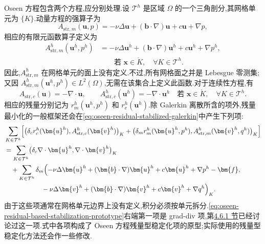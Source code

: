 \begin{example}\label{ex:oseen-residual-equations}
Oseen 方程包含两个方程,应分别处理.设 $\mathcal{T}^h$ 是区域 $\Omega$ 的一个三角剖分,其网格单元为 $\{K\}$.动量方程的强算子为
\[
  A_{\mathrm{str},m}(\bm{u},p)
  =-\nu\Delta\bm{u}
    +(\bm{b}\cdot\nabla)\bm{u}
    +c\bm{u}+\nabla p,
\]
相应的有限元函数算子定义为
\[
  \begin{aligned}
    A_{\mathrm{str},m}^h(\bm{u}^h,p^h)
      &=-\nu\Delta\bm{u}^h
        +(\bm{b}\cdot\nabla)\bm{u}^h
        +c\bm{u}^h+\nabla p^h,\\
      &\qquad\text{若 }\bm{x}\in\mathring{K},\quad
        \forall K\in\mathcal{T}^h.
  \end{aligned}
\]
因此,$A_{\mathrm{str},m}^h$ 在网格单元的面上没有定义.不过,所有网格面之并是 Lebesgue 零测集;又因 $A_{\mathrm{str},m}^h(\bm{u}^h,p^h)\in L^2(\Omega)$,无需在该集合上定义此函数.对于连续性方程,有
\[
  A_{\mathrm{str},c}(\bm{u})=-\nabla\cdot\bm{u},
  \qquad
  A_{\mathrm{str},c}^h(\bm{u}^h)
  =-\nabla\cdot\bm{u}^h
  \quad\text{若 }\bm{x}\in\mathring{K},\quad
    \forall K\in\mathcal{T}^h.
\]
相应的残量分别记为 $r_m^h(\bm{u}^h,p^h)$ 和 $r_c^h(\bm{u}^h)$.除 Galerkin 离散所含的项外,残量最小化的一般框架还会在\cref{eq:oseen-residual-stabilized-galerkin}中产生下列项:
\begin{equation}\label{eq:oseen-residual-based-stabilization-prototype}
\begin{aligned}
  &\sum_{K\in\mathcal{T}^h}
    \Bigl[\bigl(\delta_c r_c^h(\bm{u}^h),
                    A_{\mathrm{str},c}^h(\bm{v}^h)\bigr)_K
         +\bigl(\delta_m r_m^h(\bm{u}^h,p^h),
                    A_{\mathrm{str},m}^h(\bm{v}^h,q^h)\bigr)_K\Bigr]\\
  &=\sum_{K\in\mathcal{T}^h}
       \bigl(\delta_c\nabla\cdot\bm{u}^h,
             \nabla\cdot\bm{v}^h\bigr)_K\\
  &\quad+\sum_{K\in\mathcal{T}^h}
       \delta_m\Bigl(-\nu\Delta\bm{u}^h
          +(\bm{b}\cdot\nabla)\bm{u}^h
          +c\bm{u}^h+\nabla p^h-\bm{f},\\
  &\hspace{5.6em}-\nu\Delta\bm{v}^h
          +(\bm{b}\cdot\nabla)\bm{v}^h
          +c\bm{v}^h+\nabla q^h\Bigr)_K.
\end{aligned}
\end{equation}
由于这些项通常在网格单元边界上没有定义,积分必须按单元拆分.\cref{eq:oseen-residual-based-stabilization-prototype}右端第一项是 grad-div 项,第\hyperref[sec:stokes-grad-div-stabilization]{4.6.1 节}已经讨论过这一项.式中各项构成了 Oseen 方程残量型稳定化项的原型;实际使用的残量型稳定化方法还会作一些修改.
\end{example}
